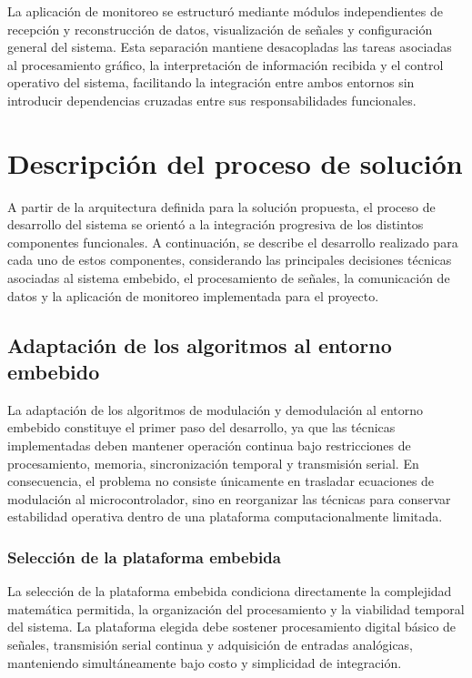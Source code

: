 La aplicación de monitoreo se estructuró mediante módulos independientes de recepción y reconstrucción de datos, visualización de señales y configuración general del sistema. Esta separación mantiene desacopladas las tareas asociadas al procesamiento gráfico, la interpretación de información recibida y el control operativo del sistema, facilitando la integración entre ambos entornos sin introducir dependencias cruzadas entre sus responsabilidades funcionales.

\section{Descripción del proceso de solución}

A partir de la arquitectura definida para la solución propuesta, el proceso de desarrollo del sistema se orientó a la integración progresiva de los distintos componentes funcionales. A continuación, se describe el desarrollo realizado para cada uno de estos componentes, considerando las principales decisiones técnicas asociadas al sistema embebido, el procesamiento de señales, la comunicación de datos y la aplicación de monitoreo implementada para el proyecto.



\label{sec:adaptacion}
\subsection{Adaptación de los algoritmos al entorno embebido}

La adaptación de los algoritmos de modulación y demodulación al entorno embebido constituye el primer paso del desarrollo, ya que las técnicas implementadas deben mantener operación continua bajo restricciones de procesamiento, memoria, sincronización temporal y transmisión serial. En consecuencia, el problema no consiste únicamente en trasladar ecuaciones de modulación al microcontrolador, sino en reorganizar las técnicas para conservar estabilidad operativa dentro de una plataforma computacionalmente limitada.

\subsubsection{Selección de la plataforma embebida}

La selección de la plataforma embebida condiciona directamente la complejidad matemática permitida, la organización del procesamiento y la viabilidad temporal del sistema. La plataforma elegida debe sostener procesamiento digital básico de señales, transmisión serial continua y adquisición de entradas analógicas, manteniendo simultáneamente bajo costo y simplicidad de integración.

